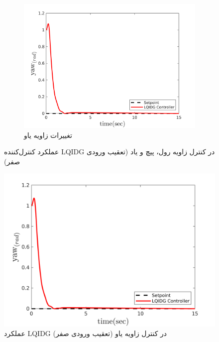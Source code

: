 \begin{figure}
	\centering
	\begin{subfigure}
		\centering
		\includegraphics[width=12cm]{../Figures/MIL/LQIDG/3DOF/lqidg_yaw.png}
		\caption{تغییرات زاویه یاو}
	\end{subfigure}
	\caption{‫‪عملکرد کنترل‌کننده LQIDG در کنترل زاویه رول، پیچ و یاد (تعقیب ورودی صفر)}
\end{figure}



\begin{figure}[H]
	\includegraphics[width=12cm]{../Figures/MIL/LQIDG/3DOF/lqidg_yaw.png}
	\centering
	\caption{عملكرد LQIDG در کنترل زاويه یاو (تعقیب ورودی صفر)}
\end{figure}

